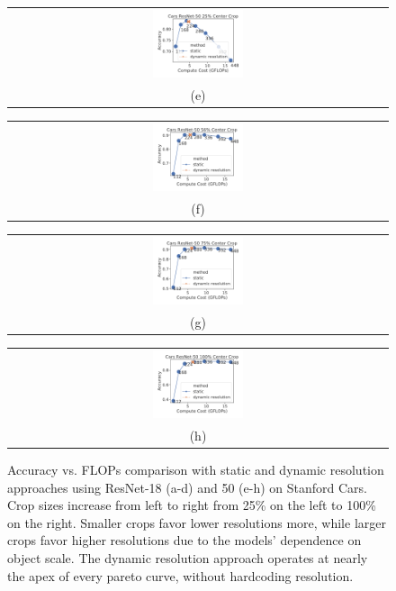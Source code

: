 \begin{figure}[t]
\begin{tabular}{@{}c@{}}
    \includegraphics[width=0.245\textwidth]{e2e_figures/cars_resnet50_25_center.pdf} \\
    \small (e)
    \end{tabular}
    \begin{tabular}{@{}c@{}}
    \includegraphics[width=0.245\textwidth]{e2e_figures/cars_resnet50_56_center.pdf} \\
    \small (f)
    \end{tabular}
    \begin{tabular}{@{}c@{}}
    \includegraphics[width=0.245\textwidth]{e2e_figures/cars_resnet50_default_center.pdf} \\
    \small (g)
    \end{tabular}
    \begin{tabular}{@{}c@{}}
    \includegraphics[width=0.245\textwidth]{e2e_figures/cars_resnet50_full_center.pdf} \\
    \small (h)
    \end{tabular}
    \caption{Accuracy vs. FLOPs comparison with static and dynamic resolution approaches using ResNet-18 (a-d) and 50 (e-h) on Stanford Cars. Crop sizes increase from left to right from 25\% on the left to 100\% on the right. Smaller crops favor lower resolutions more, while larger crops favor higher resolutions due to the models' dependence on object scale. The dynamic resolution approach operates at nearly the apex of every pareto curve, without hardcoding resolution.}
    \label{fig:accflops_resnet}
\end{figure}
